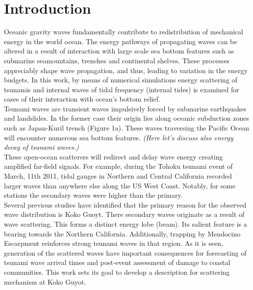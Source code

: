 \newpage
\section{Introduction}
Oceanic gravity waves fundamentally contribute to redistribution of mechanical energy in the world ocean. The energy pathways of propagating waves can be altered in a result of interaction with large scale sea bottom features such as submarine seamountains, trenches and continental shelves. These processes appreciably shape wave propagation, and thus, leading to variation in the energy budgets. In this work, by means of numerical simulations  energy scattering of tsunamis and internal waves of tidal frequency (internal tides) is examined for cases of their interaction with ocean's bottom relief.\\
Tsunami waves are transient waves impulsively forced by submarine earthquakes and landslides. In the former case their origin lies along oceanic subduction zones such as Japan-Kuril trench (Figure 1a). These waves traversing the Pacific Ocean will encounter numerous sea bottom features. \textit{(Here let's discuss also energy decay of tsunami waves.)}\\
These open-ocean scatterers will redirect and delay wave energy creating amplified far-field signals. For example, during the Tohoku tsunami event of March, 11th 2011, tidal gauges in Northern and Central California recorded larger waves than anywhere else along the US West Coast. Notably, for some stations the secondary waves were higher than the primary.\\
Several previous studies have identified that the primary reason for the observed wave distribution is Koko Guoyt. There secondary waves originate as a result of wave scattering. This forms a distinct energy lobe (beam). Its salient feature is a bearing towards the Northern California. Additionally, trapping by Mendocino Escarpment reinforces strong tsunami waves in that region.  As it is seen, generation of the scattered waves have important consequences for forecasting of tsunami wave arrival times and post-event assessment of damage to coastal communities. This work sets its goal to develop a description for scattering mechanism at Koko Guyot.\\
